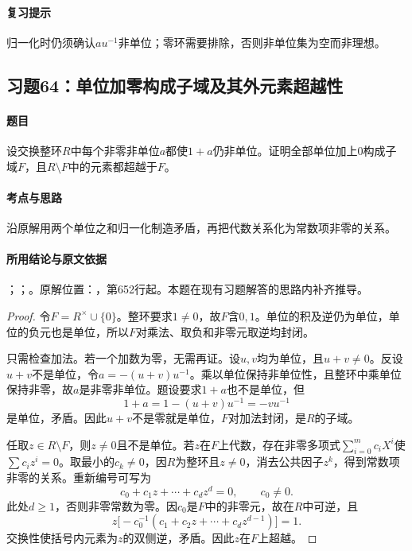 \paragraph{复习提示}

归一化时仍须确认$au^{-1}$非单位；零环需要排除，否则非单位集为空而非理想。



\subsection{习题64：单位加零构成子域及其外元素超越性}

\label{ex:3:64}

\paragraph{题目}

设交换整环$R$中每个非零非单位$a$都使$1+a$仍非单位。证明全部单位加上$0$构成子域$F$，且$R\setminus F$中的元素都超越于$F$。

\paragraph{考点与思路}

沿原解用两个单位之和归一化制造矛盾，再把代数关系化为常数项非零的关系。

\paragraph{所用结论与原文依据}

；；。原解位置：，第652行起。本题在现有习题解答的思路内补齐推导。


\begin{proof}

令$F=R^\times\cup\{0\}$。整环要求$1\ne0$，故$F$含$0,1$。单位的积及逆仍为单位，单位的负元也是单位，所以$F$对乘法、取负和非零元取逆均封闭。

只需检查加法。若一个加数为零，无需再证。设$u,v$均为单位，且$u+v\ne0$。反设$u+v$不是单位，令$a=-(u+v)u^{-1}$。乘以单位保持非单位性，且整环中乘单位保持非零，故$a$是非零非单位。题设要求$1+a$也不是单位，但
\[
1+a=1-(u+v)u^{-1}=-vu^{-1}
\]
是单位，矛盾。因此$u+v$不是零就是单位，$F$对加法封闭，是$R$的子域。

任取$z\in R\setminus F$，则$z\ne0$且不是单位。若$z$在$F$上代数，存在非零多项式$\sum_{i=0}^m c_iX^i$使$\sum c_iz^i=0$。取最小的$c_k\ne0$，因$R$为整环且$z\ne0$，消去公共因子$z^k$，得到常数项非零的关系。重新编号可写为
\[
c_0+c_1z+\cdots+c_dz^d=0,\qquad c_0\ne0.
\]
此处$d\ge1$，否则非零常数为零。因$c_0$是$F$中的非零元，故在$R$中可逆，且
\[
z\bigl[-c_0^{-1}(c_1+c_2z+\cdots+c_dz^{d-1})\bigr]=1.
\]
交换性使括号内元素为$z$的双侧逆，矛盾。因此$z$在$F$上超越。

\end{proof}

